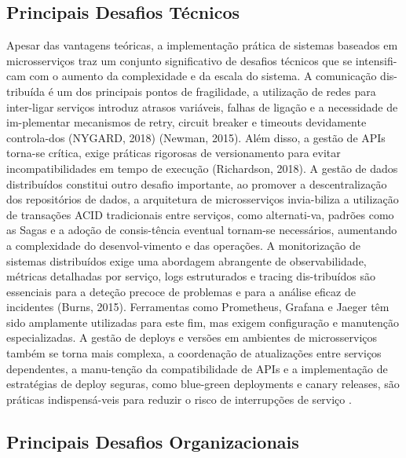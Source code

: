 \subsection{Principais Desafios Técnicos}

Apesar das vantagens teóricas, a implementação prática de sistemas baseados em microsserviços traz um conjunto significativo de desafios técnicos que se intensifi-cam com o aumento da complexidade e da escala do sistema. A comunicação dis-tribuída é um dos principais pontos de fragilidade, a utilização de redes para inter-ligar serviços introduz atrasos variáveis, falhas de ligação e a necessidade de im-plementar mecanismos de retry, circuit breaker e timeouts devidamente controla-dos (NYGARD, 2018) (Newman, 2015). Além disso, a gestão de APIs torna-se crítica, exige práticas rigorosas de versionamento para evitar incompatibilidades em tempo de execução (Richardson, 2018).
A gestão de dados distribuídos constitui outro desafio importante, ao promover a descentralização dos repositórios de dados, a arquitetura de microsserviços invia-biliza a utilização de transações ACID tradicionais entre serviços, como alternati-va, padrões como as Sagas \cite{Garcia-Molina1987} e a adoção de consis-tência eventual tornam-se necessários, aumentando a complexidade do desenvol-vimento e das operações.
A monitorização de sistemas distribuídos exige uma abordagem abrangente de observabilidade, métricas detalhadas por serviço, logs estruturados e tracing dis-tribuídos são essenciais para a deteção precoce de problemas e para a análise eficaz de incidentes (Burns, 2015). Ferramentas como Prometheus, Grafana e Jaeger têm sido amplamente utilizadas para este fim, mas exigem configuração e manutenção especializadas.
A gestão de deploys e versões em ambientes de microsserviços também se torna mais complexa, a coordenação de atualizações entre serviços dependentes, a manu-tenção da compatibilidade de APIs e a implementação de estratégias de deploy seguras, como blue-green deployments e canary releases, são práticas indispensá-veis para reduzir o risco de interrupções de serviço \cite{Humble2010}.

\subsection{Principais Desafios Organizacionais}

